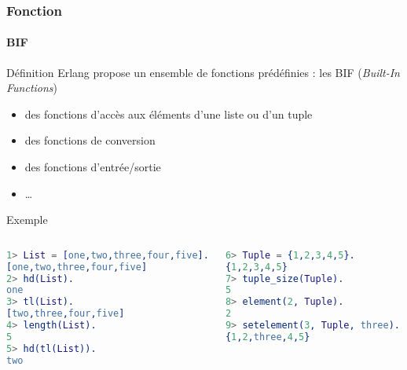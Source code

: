 \begin{frame}[fragile]
  \frametitle{Fonction}
  \framesubtitle{BIF}

  \begin{block}{Définition}
    Erlang propose un ensemble de fonctions prédéfinies : les BIF
    (\textit{Built-In Functions})
    \begin{itemize}
    \item des fonctions d'accès aux éléments d'une liste ou d'un tuple
    \item des fonctions de conversion
    \item des fonctions d'entrée/sortie
    \item \ldots
    \end{itemize}
  \end{block}

  \begin{exampleblock}{Exemple}
    \begin{columns}
      \begin{lstlisting}[language=erlang]
1> List = [one,two,three,four,five].
[one,two,three,four,five]
2> hd(List).
one
3> tl(List).
[two,three,four,five]
4> length(List).
5
5> hd(tl(List)).
two
      \end{lstlisting}
      \begin{lstlisting}[language=erlang]
6> Tuple = {1,2,3,4,5}.
{1,2,3,4,5}
7> tuple_size(Tuple).
5
8> element(2, Tuple).
2
9> setelement(3, Tuple, three).
{1,2,three,4,5}
      \end{lstlisting}
    \end{columns}
  \end{exampleblock}

\end{frame}
